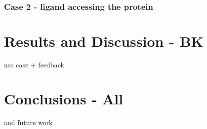 \documentclass[twocolumn]{bmcart}%
\begin{document}




 



\subsubsection{Case 2 - ligand accessing the protein}
\label{sec:case2}
  



\section*{Results and Discussion - BK}
use case + feedback

\section*{Conclusions - All}
and future work 

\end{document}

